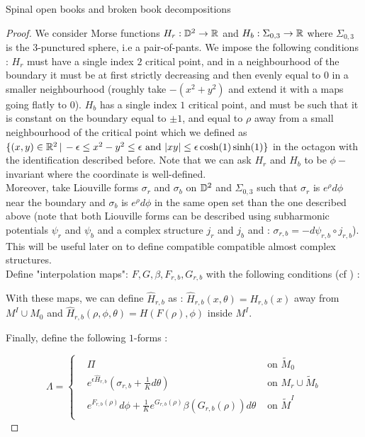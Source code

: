 \documentclass[../main.tex]{subfiles}
\begin{document}
\begin{section}{Spinal open books and broken book decompositions}
\begin{proof}
We consider Morse functions $H_r : \mathbb{D}^2 \rightarrow \mathbb{R}$ and $H_b : \Sigma_{0,3}\rightarrow \mathbb{R}$ where $\Sigma_{0,3}$ is the 3-punctured sphere, i.e a pair-of-pants.  We impose the following conditions : 
$H_r$ must have a single index $2$ critical point, and in a neighbourhood of the boundary it must be at first strictly decreasing and then evenly equal to $0$ in a smaller neighbourhood (roughly take $-(x^2 + y^2)$ and extend it with a maps going flatly to $0$). $H_b$ has a single index $1$ critical point, and must be such that it is constant on the boundary equal to $\pm 1$, and equal to $\rho$ away from a small neighbourhood of the critical point which we defined as $\{(x,y)\in \mathbb{R}^2 \,|\, -\epsilon\leq x^2- y^2 \leq \epsilon\text{ and } |xy|\leq \epsilon\cosh(1)\sinh(1)\}$ in the octagon with the identification described before. Note that we can ask $H_r$ and $H_b$ to be $\phi-$invariant where the coordinate is well-defined. \\

Moreover, take Liouville forms $\sigma_r$ and $\sigma_b$ on $\mathbb{D}^2$ and $\Sigma_{0,3}$ such that $\sigma_r$ is $e^{\rho}d\phi$ near the boundary and $\sigma_b$ is $e^{\rho}d\phi$ in the same open set than the one described above (note that both Liouville forms can be described using subharmonic potentials $\psi_r$ and $\psi_b$ and a complex structure $j_r$ and $j_b$ and : $\sigma_{r,b} = -d\psi_{r,b}\circ j_{r,b}$). This will be useful later on to define compatible compatible almost complex structures. \\

Define "interpolation maps": $F,G,\beta,F_{r,b},G_{r,b}$ with the following conditions (cf \cite{SOBD2}) :





With these maps, we can define $\hat{H}_{r,b}$ as : $\hat{H}_{r,b}(x,\theta) = H_{r,b}(x)$ away from $M^I\cup M_0$ and $\hat H_{r,b}(\rho,\phi,\theta) = H(F(\rho),\phi)$ inside $M^I$.

Finally, define the following $1$-forms :

$$\Lambda = 
\left\{
    \begin{array}{lll}
    & \Pi &\mbox{ on } \tilde M_0\\
    & e^{\epsilon \hat H_{r,b}}(\sigma_{r,b} + \frac{1}{K}d\theta)&\mbox{ on } M_r\cup \tilde M_b\\
    &  e^{F_{r,b}(\rho)}d\phi + \frac{1}{K}e^{G_{r,b}(\rho)}\beta(G_{r,b}(\rho))d\theta &\mbox{ on } \tilde M^I\\
    \end{array}
\right.$$


\end{proof}
\end{section}
\end{document}
